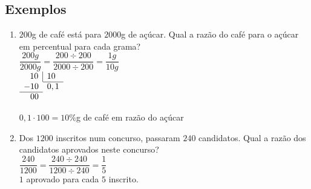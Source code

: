 \subsection{Exemplos}
\begin{enumerate}
	\item $200$g de café está para $2000$g de açúcar. Qual a razão do café para o açúcar em percentual para cada grama?\\
	
	$\dfrac{200g}{2000g}  = \dfrac{200 \div 200}{2000 \div 200} = \dfrac{1g}{10g}$ \\
	
	$
	\begin{array}{l l r r}
	\multicolumn{2}{r}{10} \vline & \multicolumn{2}{l}{10} \\ \cline{3-4}
	\multicolumn{2}{l}{-10} & \multicolumn{2}{l}{0,1} \\ \cline{1-2}
	\multicolumn{2}{r}{00} &  \\
	\end{array}
	$
	
	$0,1 \cdot 100 = 10\%$g de café em razão do açúcar
	
	\item Dos $1200$ inscritos num concurso, passaram $240$ candidatos. Qual a razão dos candidatos aprovados neste concurso?\\
	
	$\dfrac{240}{1200}  = \dfrac{240 \div 240}{1200 \div 240} = \dfrac{1}{5}$\\
	
	 $1$ aprovado para cada $5$ inscrito.\\
	

\end{enumerate}
